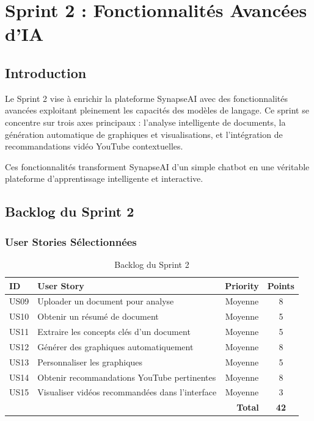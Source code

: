 
\chapter{Sprint 2 : Fonctionnalités Avancées d'IA}
\label{chap:sprint2}

\section{Introduction}

Le Sprint 2 vise à enrichir la plateforme SynapseAI avec des fonctionnalités avancées exploitant pleinement les capacités des modèles de langage. Ce sprint se concentre sur trois axes principaux : l'analyse intelligente de documents, la génération automatique de graphiques et visualisations, et l'intégration de recommandations vidéo YouTube contextuelles.

Ces fonctionnalités transforment SynapseAI d'un simple chatbot en une véritable plateforme d'apprentissage intelligente et interactive.

\section{Backlog du Sprint 2}

\subsection{User Stories Sélectionnées}

\begin{table}[H]
\centering
\caption{Backlog du Sprint 2}
\label{tab:backlog-sprint2}
\begin{tabular}{|l|p{7cm}|c|c|}
\hline
\textbf{ID} & \textbf{User Story} & \textbf{Priority} & \textbf{Points} \\
\hline
US09 & Uploader un document pour analyse & Moyenne & 8 \\
\hline
US10 & Obtenir un résumé de document & Moyenne & 5 \\
\hline
US11 & Extraire les concepts clés d'un document & Moyenne & 5 \\
\hline
US12 & Générer des graphiques automatiquement & Moyenne & 8 \\
\hline
US13 & Personnaliser les graphiques & Moyenne & 5 \\
\hline
US14 & Obtenir recommandations YouTube pertinentes & Moyenne & 8 \\
\hline
US15 & Visualiser vidéos recommandées dans l'interface & Moyenne & 3 \\
\hline
\multicolumn{3}{|r|}{\textbf{Total}} & \textbf{42} \\
\hline
\end{tabular}
\end{table}

